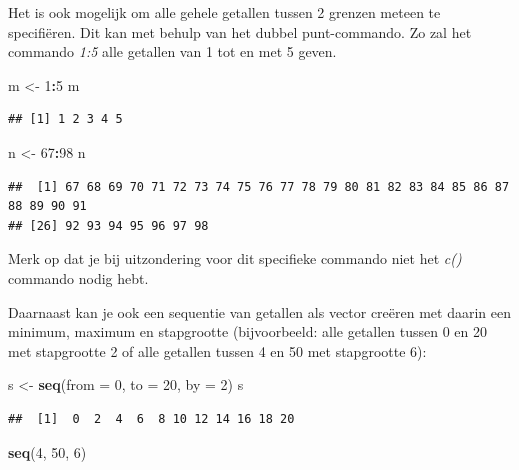 \documentclass[
]{book}
\newenvironment{Shaded}{\begin{snugshade}}{\end{snugshade}}
\newcommand{\AttributeTok}[1]{\textcolor[rgb]{0.13,0.29,0.53}{#1}}
\newcommand{\DecValTok}[1]{\textcolor[rgb]{0.00,0.00,0.81}{#1}}
\newcommand{\FunctionTok}[1]{\textcolor[rgb]{0.13,0.29,0.53}{\textbf{#1}}}
\newcommand{\NormalTok}[1]{#1}
\newcommand{\OtherTok}[1]{\textcolor[rgb]{0.56,0.35,0.01}{#1}}
\newcommand{\SpecialCharTok}[1]{\textcolor[rgb]{0.81,0.36,0.00}{\textbf{#1}}}
\begin{document}
Het is ook mogelijk om alle gehele getallen tussen 2 grenzen meteen te specifiëren.
Dit kan met behulp van het dubbel punt-commando. Zo zal het commando \emph{1:5} alle getallen
van 1 tot en met 5 geven.

\begin{Shaded}
\begin{Highlighting}[]
\NormalTok{m }\OtherTok{\textless{}{-}} \DecValTok{1}\SpecialCharTok{:}\DecValTok{5}
\NormalTok{m}
\end{Highlighting}
\end{Shaded}

\begin{verbatim}
## [1] 1 2 3 4 5
\end{verbatim}

\begin{Shaded}
\begin{Highlighting}[]
\NormalTok{n }\OtherTok{\textless{}{-}} \DecValTok{67}\SpecialCharTok{:}\DecValTok{98}
\NormalTok{n}
\end{Highlighting}
\end{Shaded}

\begin{verbatim}
##  [1] 67 68 69 70 71 72 73 74 75 76 77 78 79 80 81 82 83 84 85 86 87 88 89 90 91
## [26] 92 93 94 95 96 97 98
\end{verbatim}

Merk op dat je bij uitzondering voor dit specifieke commando niet het \emph{c()} commando nodig hebt.

Daarnaast kan je ook een sequentie van getallen als vector creëren met daarin een minimum, maximum en stapgrootte (bijvoorbeeld: alle getallen tussen 0 en 20 met stapgrootte 2 of alle getallen tussen 4 en 50 met stapgrootte 6):

\begin{Shaded}
\begin{Highlighting}[]
\NormalTok{s }\OtherTok{\textless{}{-}} \FunctionTok{seq}\NormalTok{(}\AttributeTok{from =} \DecValTok{0}\NormalTok{, }\AttributeTok{to =} \DecValTok{20}\NormalTok{, }\AttributeTok{by =} \DecValTok{2}\NormalTok{)}
\NormalTok{s}
\end{Highlighting}
\end{Shaded}

\begin{verbatim}
##  [1]  0  2  4  6  8 10 12 14 16 18 20
\end{verbatim}

\begin{Shaded}
\begin{Highlighting}[]
\FunctionTok{seq}\NormalTok{(}\DecValTok{4}\NormalTok{, }\DecValTok{50}\NormalTok{, }\DecValTok{6}\NormalTok{)}
\end{Highlighting}
\end{Shaded}
\end{document}
